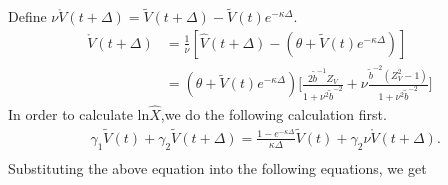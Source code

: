 \documentclass{ws-ijfe}
\begin{document}
Define $\nu \mathring{V}(t+\Delta)=\tilde{V}(t+\Delta)-\tilde{V}(t)e^{-\kappa\Delta}$.\\
\begin{equation*}
\begin{split}
\mathring{V}(t+\Delta)%
&=\frac{1}{\nu}[\hat{V}(t+\Delta)-(\theta+\tilde{V}(t)e^{-\kappa\Delta})]\\
&=(\theta+\tilde{V}(t)e^{-\kappa\Delta})\bigg[\frac{2\tilde{b}^{-1}Z_V}{1+\nu^2\tilde{b}^{-2}}+\nu\frac{\tilde{b}^{-2}(Z_V^2-1)}{1+\nu^2\tilde{b}^{-2}}\bigg]
\end{split}
\end{equation*}
In order to calculate $\text{ln}\hat{X}$,we do the following calculation first.\\
\begin{equation*}
\begin{split}
&\gamma_1\tilde{V}(t)+\gamma_2\tilde{V}(t+\Delta)
=%
\frac{1-e^{-\kappa\Delta}}{\kappa\Delta}\tilde{V}(t)+\gamma_2\nu\mathring{V}(t+\Delta).\\
\end{split}
\end{equation*}
Substituting the above equation into the following equations, we get
\end{document}
